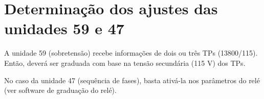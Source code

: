 \section{Determinação dos ajustes das unidades 59 e 47}

A unidade 59 (sobretensão) recebe informações de dois ou três TPs (13800/115). Então, deverá ser graduada com base na tensão secundária (115 V) dos TPs.

No caso da unidade 47 (sequência de fases), basta ativá-la nos parâmetros do relé (ver software de graduação do relé).

\begin{comment}
Neste estudo, o relé de subtensão (função 27) será conectado à rede de 13,8 kV por meio de dois TPs (13800/220 →RTP = 62,7), 100 VA, ligados em delta aberto ou “V”. Então, o relé irá monitorar a tensão de linha do sistema. Por sugestão da NORMA DISTRIBU-ENGE-0023/COSERN, essa unidade poderá ser graduada para atuar quando a tensão do sistema “cair” para um valor igual ou menor do que 0,85 p.u, ou seja, igual ou menor do que 11,7 kV. Por segurança, será graduado para atuar quando a tensão for igual ou menor do que 11,5 kV (valor primário).

A graduação do tempo de atuação do relé de subtensão (função 27) levará em conta o tempo acumulado da sequência de operação do religador de retaguarda (proteção geral do alimentador da Concessionária), de modo a assegurar que não haja atuação indesejada dessa proteção durante o ciclo de operação normal do religador, pois o relé iria desligar a respectiva subestação desnecessariamente. Então, de acordo com essas considerações, o tempo de atuação do relé será graduado em 12 s (tempo definido).    
\end{comment}
